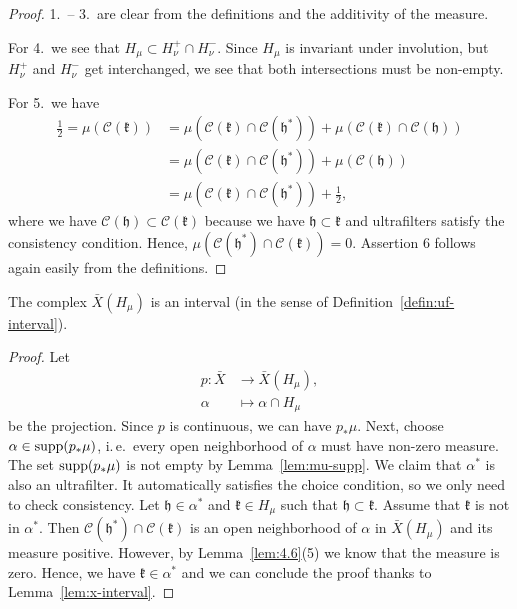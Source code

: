 \begin{proof}
  1.\ -- 3.\ are clear from the definitions and the additivity of the measure.

  For 4.\ we see that \(H_\mu \subset H_\nu^+ \cap H_\nu^-\). Since \(H_\mu\) is invariant under involution, but \(H_\nu^+\) and \(H_\nu^-\) get interchanged, we see that both intersections must be non-empty.

  For 5.\ we have
  \begin{align*}
    \frac{1}{2} = \mu(\mathcal{C}(\mathfrak{k}))
    & = \mu(\mathcal{C}(\mathfrak{k}) \cap \mathcal{C}(\mathfrak{h^\ast})) + \mu(\mathcal{C}(\mathfrak{k}) \cap \mathcal{C}(\mathfrak{h}))\\
    & = \mu(\mathcal{C}(\mathfrak{k}) \cap \mathcal{C}(\mathfrak{h^\ast})) + \mu(\mathcal{C}(\mathfrak{h}))\\
    & = \mu(\mathcal{C}(\mathfrak{k}) \cap \mathcal{C}(\mathfrak{h^\ast})) + \frac{1}{2},
  \end{align*}
  where we have \(\mathcal{C}(\mathfrak{h}) \subset \mathcal{C}(\mathfrak{k})\) because we have \(\mathfrak{h} \subset \mathfrak{k}\) and ultrafilters satisfy the consistency condition. Hence, \(\mu(\mathcal{C}(\mathfrak{h^\ast}) \cap \mathcal{C}(\mathfrak{k})) = 0\). Assertion 6 follows again easily from the definitions.
\end{proof}

\begin{lemma}[{\cite[Lemma 4.7]{MR3509968}}]
  \label{lem:interval}
  The complex \(\bar X(H_\mu)\) is an interval (in the sense of Definition~\ref{defin:uf-interval}).
\end{lemma}

\begin{proof}
  Let
  \begin{align*}
    p \colon \bar X &\to \bar X (H_\mu),\\
    \alpha &\mapsto \alpha \cap H_\mu
  \end{align*}
  be the projection. Since \(p\) is continuous, we can have \(p_\ast\mu\). Next, choose \(\alpha \in \operatorname{supp}(p_\ast \mu)\), i.\,e.\ every open neighborhood of \(\alpha\) must have non-zero measure. The set \(\operatorname{supp}(p_\ast \mu)\) is not empty by Lemma~\ref{lem:mu-supp}. We claim that \(\alpha^\ast\) is also an ultrafilter. It automatically satisfies the choice condition, so we only need to check consistency. Let \(\mathfrak{h} \in \alpha^\ast\) and \(\mathfrak{k} \in H_\mu\) such that \(\mathfrak{h} \subset \mathfrak{k}\). Assume that \(\mathfrak{k}\) is not in \(\alpha^\ast\). Then \(\mathcal{C}(\mathfrak{h^\ast}) \cap \mathcal{C}(\mathfrak{k})\) is an open neighborhood of \(\alpha\) in \(\bar X(H_\mu)\) and its measure positive. However, by Lemma~\ref{lem:4.6}(5) we know that the measure is zero. Hence, we have \(\mathfrak{k} \in \alpha^\ast\) and we can conclude the proof thanks to Lemma~\ref{lem:x-interval}.
\end{proof}

